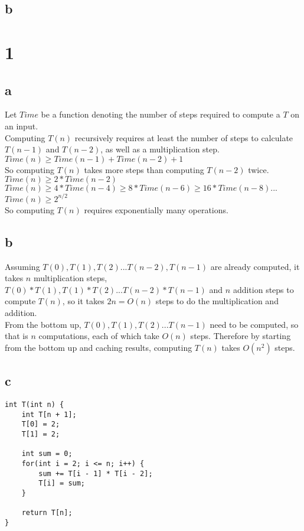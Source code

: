 \documentclass[letterpaper,notitlepage,twoside]{article}
\begin{document}
\subsection*{b}

\section*{1}
\subsection*{a}
Let $Time$ be a function denoting the number of steps required to compute a $T$ on an input. \\
Computing $T(n)$ recursively requires at least the number of steps to calculate $T(n - 1)$ and $T(n - 2)$, as well as a multiplication step. \\
$Time(n) \geq Time(n - 1) + Time(n - 2) + 1$ \\
So computing $T(n)$ takes more steps than computing $T(n - 2)$ twice. \\
$Time(n) \geq 2 * Time(n - 2)$ \\
$Time(n) \geq 4 * Time(n - 4) \geq 8 * Time(n - 6) \geq 16 * Time(n - 8) ...$ \\
$Time(n) \geq 2^{n/2}$ \\
So computing $T(n)$ requires exponentially many operations.

\subsection*{b}
Assuming $T(0), T(1), T(2)...T(n -2), T(n - 1)$ are already computed, it takes $n$ multiplication steps, $T(0) * T(1), T(1) * T(2)...T(n - 2) * T(n - 1)$ and $n$ addition steps to compute $T(n)$, so it takes $2n = O(n)$ steps to do the multiplication and addition. \\
From the bottom up, $T(0), T(1), T(2)...T(n - 1)$ need to be computed, so that is $n$ computations, each of which take $O(n)$ steps. Therefore by starting from the bottom up and caching results, computing $T(n)$ takes $O(n^2)$ steps.

\subsection*{c}
\begin{verbatim}
int T(int n) {
    int T[n + 1];
    T[0] = 2;
    T[1] = 2;
    
    int sum = 0;
    for(int i = 2; i <= n; i++) {
        sum += T[i - 1] * T[i - 2];
        T[i] = sum;
    }
    
    return T[n];
}
\end{verbatim}
\end{document}

